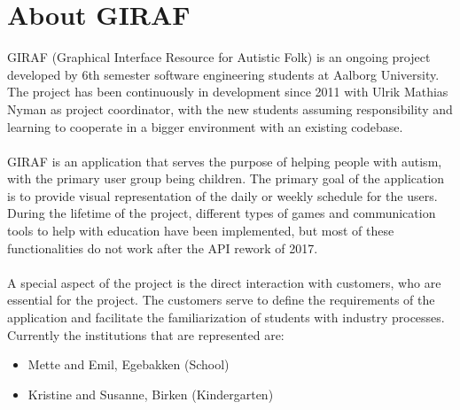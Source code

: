 \section{About GIRAF}
GIRAF (Graphical Interface Resource for Autistic Folk) is an ongoing project developed by 6th semester software engineering students at Aalborg University. 
The project has been continuously in development since 2011 with Ulrik Mathias Nyman as project coordinator, with the new students assuming responsibility and learning to cooperate in a bigger environment with an existing codebase. 
\\\\
GIRAF is an application that serves the purpose of helping people with autism, with the primary user group being children.
The primary goal of the application is to provide visual representation of the daily or weekly schedule for the users.
During the lifetime of the project, different types of games and communication tools to help with education have been implemented, but most of these functionalities do not work after the API rework of 2017.
\\\\
A special aspect of the project is the direct interaction with customers, who are essential for the project.
The customers serve to define the requirements of the application and facilitate the familiarization of students with industry processes.
\\
\noindent
Currently the institutions that are represented are: 
\begin{itemize}
    \item Mette and Emil, Egebakken (School)
    \item Kristine and Susanne, Birken (Kindergarten)
\end{itemize}
